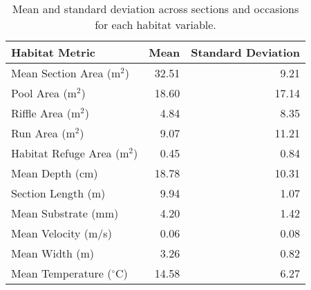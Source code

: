 \begin{table}[ht]
\centering
\caption{Mean and standard deviation across sections and occasions for each habitat variable.} 
\label{tab:habitat}
\begin{tabular}{lrr}
  \hline
Habitat Metric & Mean & Standard Deviation \\ 
  \hline
Mean Section Area (m$^2$) & 32.51 & 9.21 \\ 
  Pool Area (m$^2$) & 18.60 & 17.14 \\ 
  Riffle Area (m$^2$) & 4.84 & 8.35 \\ 
  Run Area (m$^2$) & 9.07 & 11.21 \\ 
  Habitat Refuge Area (m$^2$) & 0.45 & 0.84 \\ 
  Mean Depth (cm) & 18.78 & 10.31 \\ 
  Section Length (m) & 9.94 & 1.07 \\ 
  Mean Substrate (mm) & 4.20 & 1.42 \\ 
  Mean Velocity (m/s) & 0.06 & 0.08 \\ 
  Mean Width (m) & 3.26 & 0.82 \\ 
  Mean Temperature ($^\circ$C) & 14.58 & 6.27 \\ 
   \hline
\end{tabular}
\end{table}
